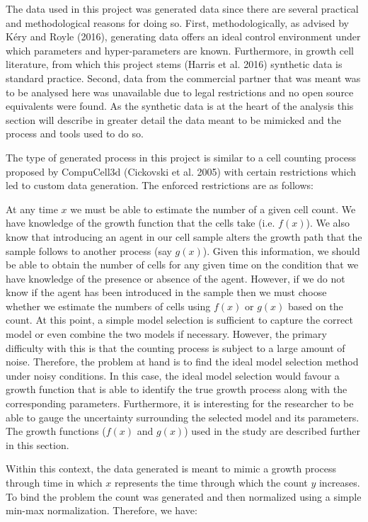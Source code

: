 \documentclass[12pt,]{article}
\begin{document}
The data used in this project was generated data since there are several practical and methodological reasons for doing so.
First, methodologically, as advised by Kéry and Royle (2016), generating data offers an ideal control environment under which parameters and hyper-parameters are known. Furthermore, in growth cell literature, from which this project stems (Harris et al. 2016) synthetic data is standard practice.
Second, data from the commercial partner that was meant was to be analysed here was unavailable due to legal restrictions and no open source equivalents were found. As the synthetic data is at the heart of the analysis this section will describe in greater detail the data meant to be mimicked and the process and tools used to do so.

The type of generated process in this project is similar to a cell counting process proposed by CompuCell3d (Cickovski et al. 2005) with certain restrictions which led to custom data generation. The enforced restrictions are as follows:

At any time \(x\) we must be able to estimate the number of a given cell count. We have knowledge of the growth function that the cells take (i.e. \(f(x)\)). We also know that introducing an agent in our cell sample alters the growth path that the sample follows to another process (say \(g(x)\)). Given this information, we should be able to obtain the number of cells for any given time on the condition that we have knowledge of the presence or absence of the agent. However, if we do not know if the agent has been introduced in the sample then we must choose whether we estimate the numbers of cells using \(f(x)\) or \(g(x)\) based on the count. At this point, a simple model selection is sufficient to capture the correct model or even combine the two models if necessary. However, the primary difficulty with this is that the counting process is subject to a large amount of noise. Therefore, the problem at hand is to find the ideal model selection method under noisy conditions. In this case, the ideal model selection would favour a growth function that is able to identify the true growth process along with the corresponding parameters. Furthermore, it is interesting for the researcher to be able to gauge the uncertainty surrounding the selected model and its parameters. The growth functions (\(f(x)\) and \(g(x)\)) used in the study are described further in this section.

Within this context, the data generated is meant to mimic a growth process through time in which \(x\) represents the time through which the count \(y\) increases. To bind the problem the count was generated and then normalized using a simple min-max normalization. Therefore, we have:
\end{document}
